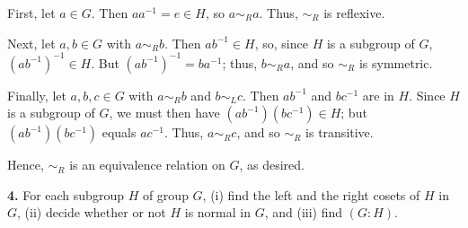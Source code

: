 \documentclass[10pt,]{book}
\theoremstyle{plain}
\theoremstyle{definition}
\theoremstyle{definition}
\theoremstyle{definition}
\theoremstyle{definition}
\numberwithin{equation}{section}
\def\siml{\sim_L}
\def\simr{\sim_R}
\begin{document}
      First, let \(a\in G\). Then \(aa^{-1}=e\in H\),
      so \(a\simr a\). Thus, \(\simr\) is reflexive.
\par

      Next, let \(a,b\in G\) with \(a\simr b\). Then
      \(ab^{-1}\in H\), so, since \(H\) is a subgroup of \(G\),
      \((ab^{-1})^{-1}\in H\). But
      \((ab^{-1})^{-1}=ba^{-1}\); thus, \(b\simr a\), and so \(\simr\) is symmetric.
\par

      Finally, let \(a,b,c\in G\) with \(a\simr b\)
      and \(b\siml c\). Then \(ab^{-1}\) and \(bc^{-1}\) are in \(H\). Since
      \(H\) is a subgroup of \(G\), we must then have
      \((ab^{-1})(bc^{-1})\in H\); but \((ab^{-1})(bc^{-1})\) equals
      \(ac^{-1}\). Thus, \(a\simr c\), and so \(\simr\) is transitive.
\par

      Hence, \(\simr\) is an equivalence relation on \(G\), as desired.
\par\smallskip
\noindent\textbf{4.}\quad{}
        For each subgroup \(H\) of group \(G\), (i) find the left and the right cosets of \(H\) in \(G\), (ii) decide whether or not \(H\) is normal in \(G\), and (iii) find \((G:H)\).
\par
\end{document}
